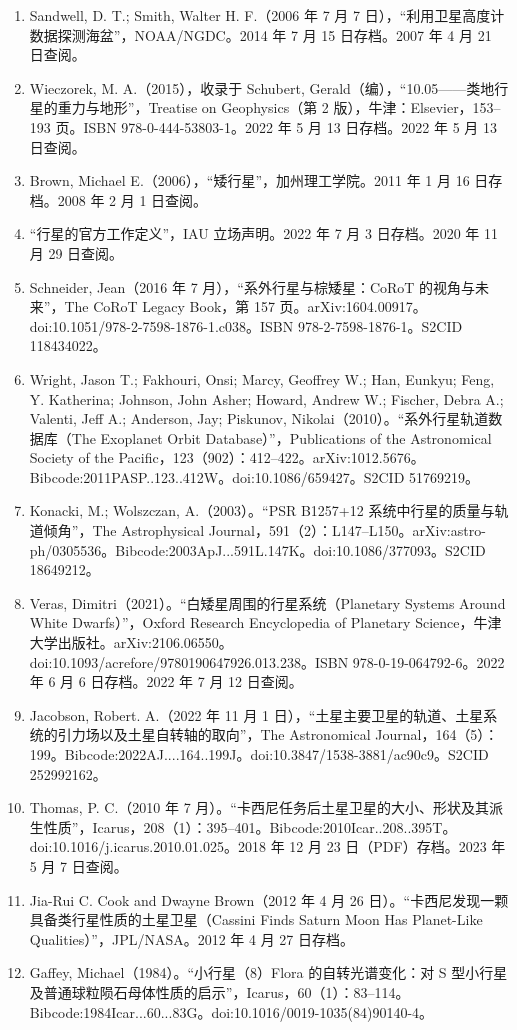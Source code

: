 \begin{enumerate}
\item Sandwell, D. T.; Smith, Walter H. F.（2006 年 7 月 7 日），“利用卫星高度计数据探测海盆”，NOAA/NGDC。2014 年 7 月 15 日存档。2007 年 4 月 21 日查阅。
\item Wieczorek, M. A.（2015），收录于 Schubert, Gerald（编），“10.05——类地行星的重力与地形”，Treatise on Geophysics（第 2 版），牛津：Elsevier，153–193 页。ISBN 978-0-444-53803-1。2022 年 5 月 13 日存档。2022 年 5 月 13 日查阅。
\item Brown, Michael E.（2006），“矮行星”，加州理工学院。2011 年 1 月 16 日存档。2008 年 2 月 1 日查阅。
\item “行星的官方工作定义”，IAU 立场声明。2022 年 7 月 3 日存档。2020 年 11 月 29 日查阅。
\item Schneider, Jean（2016 年 7 月），“系外行星与棕矮星：CoRoT 的视角与未来”，The CoRoT Legacy Book，第 157 页。arXiv:1604.00917。doi:10.1051/978-2-7598-1876-1.c038。ISBN 978-2-7598-1876-1。S2CID 118434022。
\item Wright, Jason T.; Fakhouri, Onsi; Marcy, Geoffrey W.; Han, Eunkyu; Feng, Y. Katherina; Johnson, John Asher; Howard, Andrew W.; Fischer, Debra A.; Valenti, Jeff A.; Anderson, Jay; Piskunov, Nikolai（2010）。“系外行星轨道数据库（The Exoplanet Orbit Database）”，Publications of the Astronomical Society of the Pacific，123（902）：412–422。arXiv:1012.5676。Bibcode:2011PASP..123..412W。doi:10.1086/659427。S2CID 51769219。
\item Konacki, M.; Wolszczan, A.（2003）。“PSR B1257+12 系统中行星的质量与轨道倾角”，The Astrophysical Journal，591（2）：L147–L150。arXiv:astro-ph/0305536。Bibcode:2003ApJ...591L.147K。doi:10.1086/377093。S2CID 18649212。
\item Veras, Dimitri（2021）。“白矮星周围的行星系统（Planetary Systems Around White Dwarfs）”，Oxford Research Encyclopedia of Planetary Science，牛津大学出版社。arXiv:2106.06550。doi:10.1093/acrefore/9780190647926.013.238。ISBN 978-0-19-064792-6。2022 年 6 月 6 日存档。2022 年 7 月 12 日查阅。
\item Jacobson, Robert. A.（2022 年 11 月 1 日），“土星主要卫星的轨道、土星系统的引力场以及土星自转轴的取向”，The Astronomical Journal，164（5）：199。Bibcode:2022AJ....164..199J。doi:10.3847/1538-3881/ac90c9。S2CID 252992162。
\item Thomas, P. C.（2010 年 7 月）。“卡西尼任务后土星卫星的大小、形状及其派生性质”，Icarus，208（1）：395–401。Bibcode:2010Icar..208..395T。doi:10.1016/j.icarus.2010.01.025。2018 年 12 月 23 日（PDF）存档。2023 年 5 月 7 日查阅。
\item Jia-Rui C. Cook and Dwayne Brown（2012 年 4 月 26 日）。“卡西尼发现一颗具备类行星性质的土星卫星（Cassini Finds Saturn Moon Has Planet-Like Qualities）”，JPL/NASA。2012 年 4 月 27 日存档。
\item Gaffey, Michael（1984）。“小行星（8）Flora 的自转光谱变化：对 S 型小行星及普通球粒陨石母体性质的启示”，Icarus，60（1）：83–114。Bibcode:1984Icar...60...83G。doi:10.1016/0019-1035(84)90140-4。


\end{enumerate}

